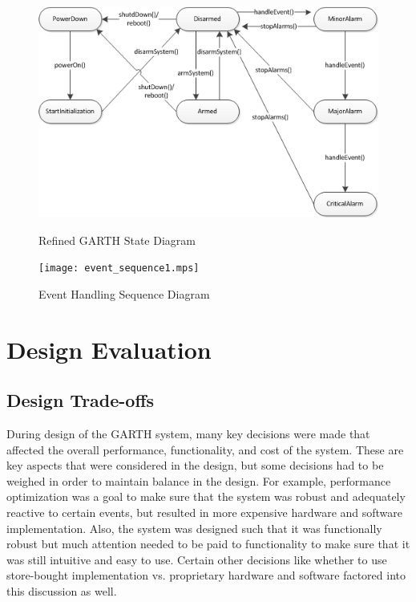 \documentclass{report}
\begin{document}
\begin{figure}[hp]
    \centering
        \caption{Refined GARTH State Diagram}
        \scriptsize
        \setlength{\unitlength}{2.0em}
        \includegraphics{state_machine.png}
        \normalsize
    \label{fig:state_machine}
\end{figure}

\begin{figure}[hp]
    \centering
        \caption{Event Handling Sequence Diagram}
        \scriptsize
        \setlength{\unitlength}{2.0em}
        \texttt{[image: event\_sequence1.mps]}
        \normalsize
    \label{fig:event_handling_sequence}
\end{figure}

\chapter{Design Evaluation} %
\label{ch:design-evaluation}

\section{Design Trade-offs}

During design of the GARTH system, many key decisions were made that affected
the overall performance, functionality, and cost of the system. These are key
aspects that were considered in the design, but some decisions had to be
weighed in order to maintain balance in the design. For example, performance
optimization was a goal to make sure that the system was robust and adequately
reactive to certain events, but resulted in more expensive hardware and
software implementation. Also, the system was designed such that it was
functionally robust but much attention needed to be paid to functionality to
make sure that it was still intuitive and easy to use. Certain other decisions
like whether to use store-bought implementation vs. proprietary hardware and
software factored into this discussion as well.
\end{document}

